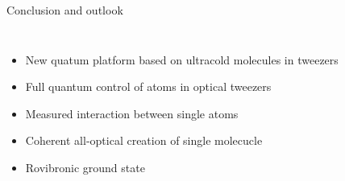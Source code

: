 \documentclass{beamer}
\begin{document}
\begin{frame}[t]{Conclusion and outlook}
  \vspace{-0.5cm}
  \begin{columns}
    \column{6.25cm}
    \begin{itemize}
    \item New quatum platform based on ultracold molecules in tweezers
    \item<2-> Full quantum control of atoms in optical tweezers
    \item<3-> Measured interaction between single atoms
    \item<4-> Coherent all-optical creation of single molecucle
    \item<5-> Rovibronic ground state
    \end{itemize}
    \column{5.7cm}
  \end{columns}
\end{frame}
\end{document}
